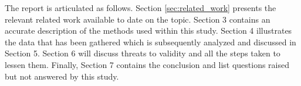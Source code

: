 The report is articulated as follows. Section \ref{sec:related_work} presents the relevant related work available to date on the topic. Section 3 contains an accurate description of the methods used within this study. Section 4 illustrates the data that has been gathered which is subsequently analyzed and discussed in Section 5. Section 6 will discuss threats to validity and all the steps taken to lessen them. Finally, Section 7 contains the conclusion and list questions raised but not answered by this study.


